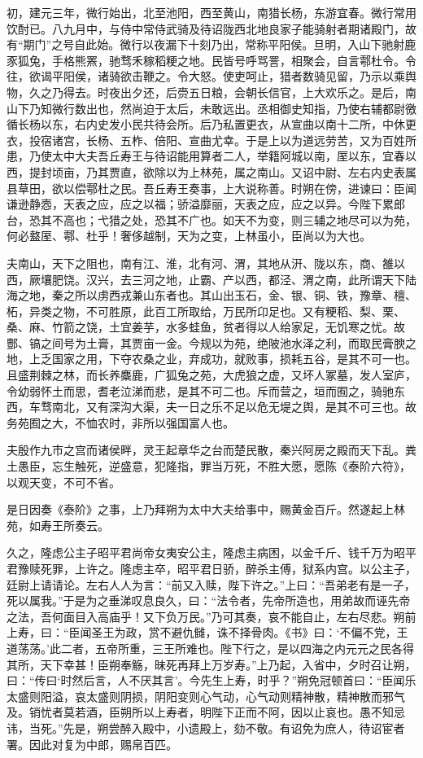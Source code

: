 \documentclass[12pt,UTF8]{ctexbook}
\begin{document}
初，建元三年，微行始出，北至池阳，西至黄山，南猎长杨，东游宜春。微行常用饮酎已。八九月中，与侍中常侍武骑及待诏陇西北地良家子能骑射者期诸殿门，故有“期门”之号自此始。微行以夜漏下十刻乃出，常称平阳侯。旦明，入山下驰射鹿豕狐兔，手格熊罴，驰骛禾稼稻粳之地。民皆号呼骂詈，相聚会，自言鄠杜令。令往，欲谒平阳侯，诸骑欲击鞭之。令大怒。使吏呵止，猎者数骑见留，乃示以乘舆物，久之乃得去。时夜出夕还，后赍五日粮，会朝长信官，上大欢乐之。是后，南山下乃知微行数出也，然尚迫于太后，未敢远出。丞相御史知指，乃使右辅都尉徼循长杨以东，右内史发小民共待会所。后乃私置更衣，从宣曲以南十二所，中休更衣，投宿诸宫，长杨、五柞、倍阳、宣曲尤幸。于是上以为道远劳苦，又为百姓所患，乃使太中大夫吾丘寿王与待诏能用算者二人，举籍阿城以南，厔以东，宜春以西，提封顷亩，乃其贾直，欲除以为上林苑，属之南山。又诏中尉、左右内史表属县草田，欲以偿鄠杜之民。吾丘寿王奏事，上大说称善。时朔在傍，进谏曰：臣闻谦逊静悫，天表之应，应之以福；骄溢靡丽，天表之应，应之以异。今陛下累郎台，恐其不高也；弋猎之处，恐其不广也。如天不为变，则三辅之地尽可以为苑，何必盩厔、鄠、杜乎！奢侈越制，天为之变，上林虽小，臣尚以为大也。



夫南山，天下之阻也，南有江、淮，北有河、渭，其地从汧、陇以东，商、雒以西，厥壤肥饶。汉兴，去三河之地，止霸、产以西，都泾、渭之南，此所谓天下陆海之地，秦之所以虏西戎兼山东者也。其山出玉石，金、银、铜、铁，豫章、檀、柘，异类之物，不可胜原，此百工所取给，万民所卬足也。又有粳稻、梨、栗、桑、麻、竹箭之饶，土宜姜芋，水多蛙鱼，贫者得以人给家足，无饥寒之忧。故酆、镐之间号为土膏，其贾亩一金。今规以为苑，绝陂池水泽之利，而取民膏腴之地，上乏国家之用，下夺农桑之业，弃成功，就败事，损耗五谷，是其不可一也。且盛荆棘之林，而长养麋鹿，广狐兔之苑，大虎狼之虚，又坏人冢墓，发人室庐，令幼弱怀土而思，耆老泣涕而悲，是其不可二也。斥而营之，垣而囿之，骑驰东西，车骛南北，又有深沟大渠，夫一日之乐不足以危无堤之舆，是其不可三也。故务苑囿之大，不恤农时，非所以强国富人也。



夫殷作九市之宫而诸侯畔，灵王起章华之台而楚民散，秦兴阿房之殿而天下乱。粪土愚臣，忘生触死，逆盛意，犯隆指，罪当万死，不胜大愿，愿陈《泰阶六符》，以观天变，不可不省。



是日因奏《泰阶》之事，上乃拜朔为太中大夫给事中，赐黄金百斤。然遂起上林苑，如寿王所奏云。



久之，隆虑公主子昭平君尚帝女夷安公主，隆虑主病困，以金千斤、钱千万为昭平君豫赎死罪，上许之。隆虑主卒，昭平君日骄，醉杀主傅，狱系内宫。以公主子，廷尉上请请论。左右人人为言：“前又入赎，陛下许之。”上曰：“吾弟老有是一子，死以属我。”于是为之垂涕叹息良久，曰：“法令者，先帝所造也，用弟故而诬先帝之法，吾何面目入高庙乎！又下负万民。”乃可其奏，哀不能自止，左右尽悲。朔前上寿，曰：“臣闻圣王为政，赏不避仇雠，诛不择骨肉。《书》曰：‘不偏不党，王道荡荡。’此二者，五帝所重，三王所难也。陛下行之，是以四海之内元元之民各得其所，天下幸甚！臣朔奉觞，昧死再拜上万岁寿。”上乃起，入省中，夕时召让朔，曰：“传曰‘时然后言，人不厌其言’。今先生上寿，时乎？”朔免冠顿首曰：“臣闻乐太盛则阳溢，哀太盛则阴损，阴阳变则心气动，心气动则精神散，精神散而邪气及。销忧者莫若酒，臣朔所以上寿者，明陛下正而不阿，因以止哀也。愚不知忌讳，当死。”先是，朔尝醉入殿中，小遗殿上，劾不敬。有诏免为庶人，待诏宦者署。因此对复为中郎，赐帛百匹。
\end{document}
